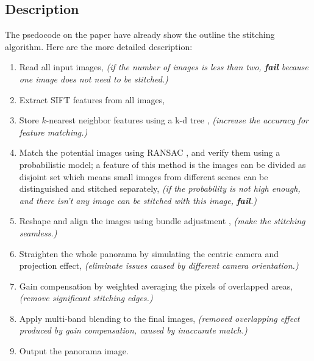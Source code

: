 \documentclass[10pt,twocolumn,letterpaper]{article}
\begin{document}
\subsection{Description}
The psedocode on the paper have already show the outline the stitching algorithm.
Here are the more detailed description:
\begin{enumerate}
    \item
        Read all input images,
        \textit{(if the number of images is less than two, \textbf{fail} because one image does not need to be stitched.)}
    \item \label{n:e}
        Extract SIFT \cite{sift} features from all images,
    \item \label{n:k}
        Store $k$-nearest neighbor features using a k-d tree \cite{knn},
        \textit{(increase the accuracy for feature matching.)}
    \item \label{n:m}
        Match the potential images using RANSAC \cite{ransac}, and verify them using a probabilistic model;
        a feature of this method is the images can be divided as disjoint set which means small images from different scenes can be distinguished and stitched separately,
        \textit{(if the probability is not high enough, and there isn't any image can be stitched with this image, \textbf{fail}.)}
    \item \label{n:r}
        Reshape and align the images using bundle adjustment \cite{bm},
        \textit{(make the stitching seamless.)}
    \item \label{n:s}
        Straighten the whole panorama by simulating the centric camera and projection effect,
        \textit{(eliminate issues caused by different camera orientation.)}
    \item \label{n:g}
        Gain compensation by weighted averaging the pixels of overlapped areas,
        \textit{(remove significant stitching edges.)}
    \item \label{n:a}
        Apply multi-band blending to the final images,
        \textit{(removed overlapping effect produced by gain compensation, caused by inaccurate match.)}
    \item \label{n:o}
        Output the panorama image.
\end{enumerate}

\end{document}
